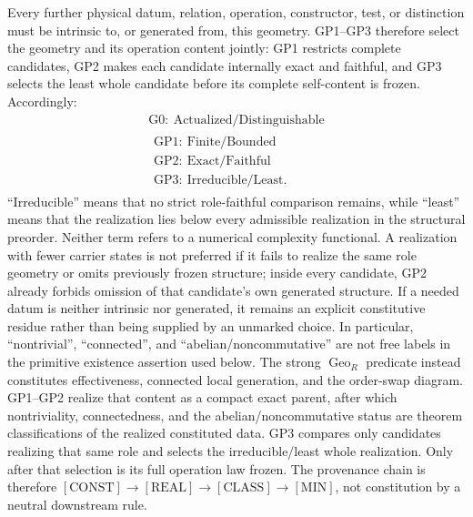 \documentclass[12pt,a4paper]{article}
\begin{document}
\begin{mdframed}[style=postulatebox,nobreak=false]
\begin{principle}
Every further physical datum, relation, operation, constructor, test, or
distinction must be intrinsic to, or generated from, this geometry.  GP1--GP3
therefore select the geometry and
its operation content jointly: GP1 restricts complete candidates, GP2 makes
each candidate internally exact and faithful, and GP3 selects the least whole
candidate before its complete self-content is frozen.  Accordingly:
\[
 \begin{gathered}
  \boxed{\mathrm{G0}:\ \text{Actualized/Distinguishable}}\\[4pt]
  \boxed{\begin{gathered}
   \mathrm{GP1}:\ \text{Finite/Bounded}\\
   \mathrm{GP2}:\ \text{Exact/Faithful}\\
   \mathrm{GP3}:\ \text{Irreducible/Least}.
  \end{gathered}}
 \end{gathered}
\]
``Irreducible'' means that no strict role-faithful comparison remains, while
``least'' means that the realization lies below every admissible realization
in the structural preorder.  Neither term refers to a numerical complexity
functional.  A realization with fewer carrier states is not preferred if it
fails to realize the same role geometry or omits previously frozen structure;
inside every candidate, GP2 already forbids omission of that candidate's own
generated structure.  If a needed datum is neither intrinsic nor generated,
it remains an explicit constitutive
residue rather than being supplied by an unmarked choice.  In particular,
``nontrivial'', ``connected'', and ``abelian/noncommutative'' are not free
labels in the primitive existence assertion used below.  The strong
\(\operatorname{Geo}_R\) predicate instead constitutes effectiveness, connected
local generation, and the order-swap diagram.  GP1--GP2 realize that content as
a compact exact parent, after which nontriviality, connectedness, and the
abelian/noncommutative status are theorem classifications of the realized
constituted data.  GP3 compares only candidates realizing that same role and
selects the irreducible/least whole realization.  Only after that selection is
its full operation law frozen.  The provenance chain is therefore
\([\mathrm{CONST}]\to[\mathrm{REAL}]\to[\mathrm{CLASS}]\to[\mathrm{MIN}]\),
not constitution by a neutral downstream rule.
\end{principle}
\end{mdframed}
\end{document}
